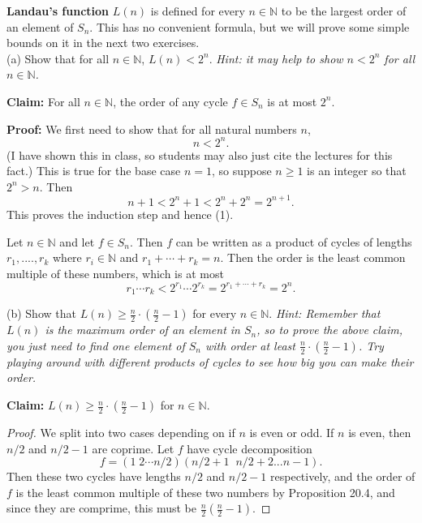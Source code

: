 \documentclass[11pt,dvipsnames]{book}
\numberwithin{equation}{section} %
\numberwithin{figure}{section} %
\numberwithin{table}{section} %
\begin{document}
 
\begin{exercise}
{\bf Landau's function} $L(n)$ is defined for every $n\in\mathbb{N}$ to be the largest order of an element of $S_{n}$. This has no convenient formula, but we will prove some simple bounds on it in the next two exercises. \\

(a) Show that  for all $n\in\mathbb{N}$, $L(n)<2^{n}$. {\it Hint: it may help to show $n<2^{n}$ for all $n\in\mathbb{N}$.}

\begin{solution}
{\bf Claim:}
For all $n\in \mathbb{N}$, the order of any cycle $f\in S_{n}$ is at most $2^{n}$. 

{\bf Proof:}
We first need to show that for all natural numbers $n$,
\begin{equation}
\label{e:n<2^n}
n<2^{n}.
\end{equation}
(I have shown this in class, so students may also just cite the lectures for this fact.) This is true for the base case $n=1$, so suppose $n\geq 1$ is an integer so that $2^{n}>n$. Then
\[
n+1<2^{n}+1<2^{n}+2^{n}=2^{n+1}. 
\]
This proves the induction step and hence (1).

Let $n\in\mathbb{N}$ and let $f\in S_{n}$. Then $f$ can be written as a product of cycles of lengths $r_{1},....,r_{k}$ where $r_{i}\in \mathbb{N}$ and $r_{1}+\cdots  + r_{k}=n$. Then the order is the least common multiple of these numbers, which is at most 
\[
r_{1}\cdots r_{k}<2^{r_{1}}\cdots 2^{r_{k}}=2^{r_{1}+\cdots + r_{k}}=2^{n}.
\]
\end{solution}

(b)  Show that $L(n)\geq\frac{n}{2}\cdot \left(\frac{n}{2}-1\right)$ for every $n\in \mathbb{N}$.  {\it Hint: Remember that $L(n)$ is the maximum order of an element in $S_{n}$, so to prove the above claim, you just need to find one element of $S_{n}$ with order at least $\frac{n}{2}\cdot \left(\frac{n}{2}-1\right)$. Try playing around with different products of cycles to see how big you can make their order.}



\begin{solution}
{\bf Claim:}
$L(n)\geq\frac{n}{2}\cdot \left(\frac{n}{2}-1\right)$ for $n\in \mathbb{N}$.

\begin{proof}
We split into two cases depending on if $n$ is even or odd. If $n$ is even, then $n/2$ and $n/2-1$ are coprime. Let $f$ have cycle decomposition 
\[
f=(1\; 2\cdots n/2)(n/2+1 \;\; n/2+2...n-1).
\]
Then these two cycles have lengths $n/2$ and $n/2-1$ respectively, and the order of $f$ is the least common multiple of these two numbers by Proposition 20.4, and since they are comprime, this must be $\frac{n}{2}\left(\frac{n}{2}-1\right)$. 


\end{proof}
\end{solution}
\end{exercise}
\end{document}
